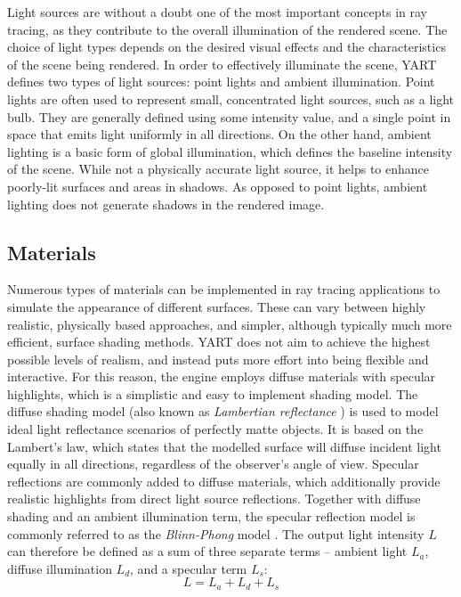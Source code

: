 Light sources are without a doubt one of the most important concepts in ray tracing, as they contribute to the overall illumination of the rendered scene.
The choice of light types depends on the desired visual effects and the characteristics of the scene being rendered.
In order to effectively illuminate the scene, YART defines two types of light sources: point lights and ambient illumination.
Point lights are often used to represent small, concentrated light sources, such as a light bulb. 
They are generally defined using some intensity value, and a single point in space that emits light uniformly in all directions.
On the other hand, ambient lighting is a basic form of global illumination, which defines the baseline intensity of the scene.
While not a physically accurate light source, it helps to enhance poorly-lit surfaces and areas in shadows. 
As opposed to point lights, ambient lighting does not generate shadows in the rendered image.

\subsection{Materials}\label{ch:Implementation/SceneRepresentation/Materials}

Numerous types of materials can be implemented in ray tracing applications to simulate the appearance of different surfaces.
These can vary between highly realistic, physically based approaches, and simpler, although typically much more efficient, surface shading methods.
YART does not aim to achieve the highest possible levels of realism, and instead puts more effort into being flexible and interactive. 
For this reason, the engine employs diffuse materials with specular highlights, which is a simplistic and easy to implement shading model.
The diffuse shading model (also known as \textit{Lambertian reflectance} \supercite{Goral1984}) is used to model ideal light reflectance scenarios of perfectly matte objects. 
It is based on the Lambert's law, which states that the modelled surface will diffuse incident light equally in all directions, regardless of the observer's angle of view.
Specular reflections are commonly added to diffuse materials, which additionally provide realistic highlights from direct light source reflections.
Together with diffuse shading and an ambient illumination term, the specular reflection model is commonly referred to as the \textit{Blinn-Phong} model \supercite{Blinn1977}.
The output light intensity $ L $ can therefore be defined as a sum of three separate terms -- ambient light $ L_a $, diffuse illumination $ L_d $, and a specular term $ L_s $:
%
\begin{equation}
    L = L_a + L_d + L_s
\end{equation}


